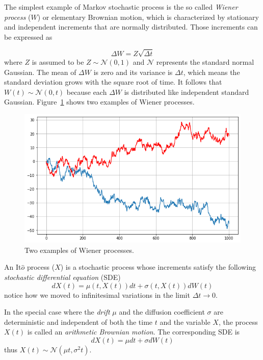 The simplest example of Markov stochastic process is the so called \emph{Wiener
process} ($W$) or elementary Brownian motion, which is characterized by stationary and 
independent increments that are normally distributed.
Those increments can be expressed as

\begin{equation}
\Delta W = Z\sqrt{\Delta t}
\end{equation}
where $Z$ is  assumed to be $Z ∼ \mathcal{N}(0, 1)$ and $\mathcal{N}$ represents the standard normal Gaussian. 
The mean of $\Delta W$ is zero and its variance is 
$\Delta t$, which means the standard deviation grows with the square root of time.
It follows that $W(t) ∼ \mathcal{N}(0, t)$ because each $\Delta W$ is distributed like independent standard Gaussian. Figure~\ref{fig:wiener_process} shows two examples of Wiener processes.

\begin{figure}[htb]
	\centering
	\includegraphics[width=0.7\linewidth]{figures/wiener_process.png}
	\caption{Two examples of Wiener processes.}
	\label{fig:wiener_process}
\end{figure}

An It$\hat{o}$ process ($X$) is a stochastic process whose increments 
satisfy the following \emph{stochastic differential equation} (SDE) 
\begin{equation}
dX(t) = \mu(t, X(t)) dt + \sigma(t, X(t)) dW(t)
\end{equation}
notice how we moved to infinitesimal variations in the limit $\Delta t\rightarrow 0$.

In the special case where the \emph{drift} $\mu$ and the diffusion coefficient $\sigma$ are deterministic and independent of both the time $t$ and the variable $X$, the process $X(t)$ is called an \emph{arithmetic Brownian motion}. The corresponding SDE is
\begin{equation}
dX(t) = \mu dt + \sigma dW(t)
\end{equation}
thus $X(t) ∼ \mathcal{N}(\mu t, \sigma^2 t)$.

